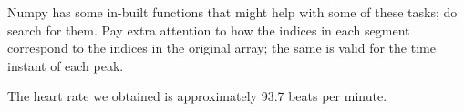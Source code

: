 Numpy has some in-built functions that might help with some of these tasks; do search for them. Pay extra attention to how the indices in each segment correspond to the indices in the original array; the same is valid for the time instant of each peak.

The heart rate we obtained is approximately 93.7 beats per minute.